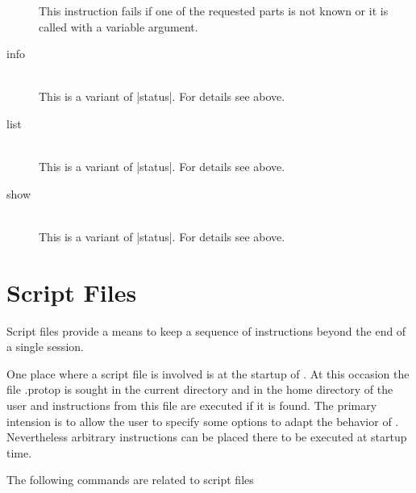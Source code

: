 \begin{description}
    This instruction fails if one of the requested parts is not known or it is
    called with a variable argument.

  \item [info]\ 
    \\
    This is a variant of |status|. For details see above.

  \item [list]\ 
    \\
    This is a variant of |status|. For details see above.

  \item [show]\ 
    \\
    This is a variant of |status|. For details see above.

\end{description}


\section{Script Files}

Script files provide a means to keep a sequence of instructions beyond the end
of a single session.

One place where a script file is involved is at the startup of \ProTop. At
this occasion the file {\sf .protop} is sought in the current directory and in
the home directory of the user and instructions from this file are executed if
it is found. The primary intension is to allow the user to specify some
options to adapt the behavior of \ProTop. Nevertheless arbitrary instructions
can be placed there to be executed at startup time.

The following commands are related to script files

